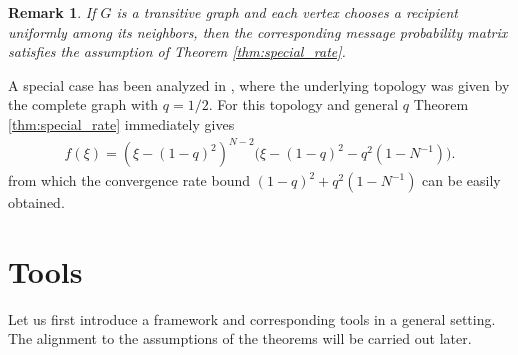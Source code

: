 \documentclass[a4paper,12pt]{article}
\newtheorem{remark}{Remark}
\begin{document}
\begin{remark}
	If $G$ is a transitive graph and each vertex chooses a recipient uniformly among its neighbors, then the corresponding message probability matrix satisfies the assumption of Theorem \ref{thm:special_rate}.
\end{remark}
A special case has been analyzed in
\cite{iutzeler2013analysis}, where the underlying topology was given by the complete graph with $q=1/2$. For this topology and general $q$ Theorem \ref{thm:special_rate} immediately gives
\begin{align*}
	f(\xi) = (\xi - (1-q)^2)^{N-2} \big(\xi-(1-q)^2- q^2(1-N^{-1})\big).
\end{align*} 
from which the convergence rate bound $(1-q)^2 + q^2(1-N^{-1})$ can be easily obtained.

\section{Tools}
\label{sec:tools}


Let us first introduce a framework and corresponding tools in a general setting. The alignment to the assumptions of the theorems will be carried out later.
\end{document}
